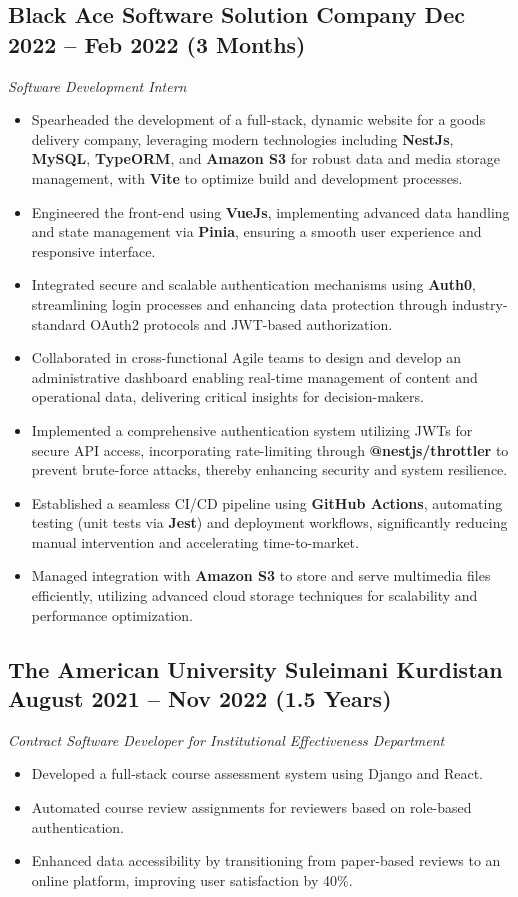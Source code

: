 \documentclass[a4paper,10pt]{article}
\begin{document}
\subsection*{Black Ace Software Solution Company \hfill Dec 2022 – Feb 2022 (3 Months)}
\textit{Software Development Intern}
\begin{itemize}
    \item Spearheaded the development of a full-stack, dynamic website for a goods delivery company, leveraging modern technologies including \textbf{NestJs}, \textbf{MySQL}, \textbf{TypeORM}, and \textbf{Amazon S3} for robust data and media storage management, with \textbf{Vite} to optimize build and development processes.
    \item Engineered the front-end using \textbf{VueJs}, implementing advanced data handling and state management via \textbf{Pinia}, ensuring a smooth user experience and responsive interface.
    \item Integrated secure and scalable authentication mechanisms using \textbf{Auth0}, streamlining login processes and enhancing data protection through industry-standard OAuth2 protocols and JWT-based authorization.
    \item Collaborated in cross-functional Agile teams to design and develop an administrative dashboard enabling real-time management of content and operational data, delivering critical insights for decision-makers.
    \item Implemented a comprehensive authentication system utilizing JWTs for secure API access, incorporating rate-limiting through \textbf{@nestjs/throttler} to prevent brute-force attacks, thereby enhancing security and system resilience.
    \item Established a seamless CI/CD pipeline using \textbf{GitHub Actions}, automating testing (unit tests via \textbf{Jest}) and deployment workflows, significantly reducing manual intervention and accelerating time-to-market.
    \item Managed integration with \textbf{Amazon S3} to store and serve multimedia files efficiently, utilizing advanced cloud storage techniques for scalability and performance optimization.
\end{itemize}


\subsection*{The American University Suleimani Kurdistan \hfill August 2021 – Nov 2022 (1.5 Years)}
\textit{Contract Software Developer for Institutional Effectiveness Department}
\begin{itemize}
    \item Developed a full-stack course assessment system using Django and React.
    \item Automated course review assignments for reviewers based on role-based authentication.
    \item Enhanced data accessibility by transitioning from paper-based reviews to an online platform, improving user satisfaction by 40\%.
\end{itemize}
\end{document}
